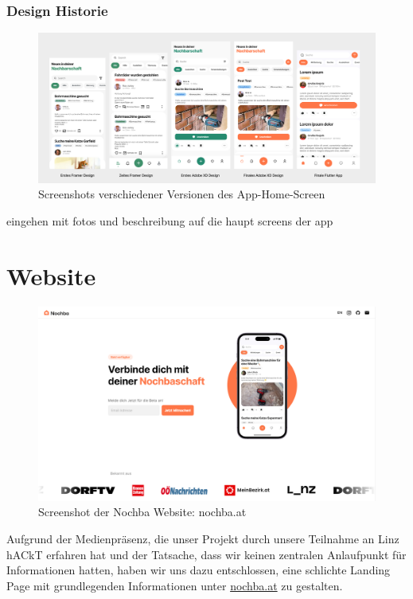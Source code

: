 \subsubsection{Design Historie}

\begin{figure}[h]
  \centering
  \includegraphics[width=1\textwidth]{pics/app-design-history.png}
  \caption{Screenshots verschiedener Versionen des App-Home-Screen}
  \label{fig:app-design-history}
  \end{figure}
eingehen mit fotos und beschreibung auf die haupt screens der app
\section{Website}
\begin{figure}[h]
  \includegraphics[width=1\textwidth]{pics/website-design.png}
  \caption{Screenshot der Nochba Website: nochba.at}
\end{figure}

Aufgrund der Medienpräsenz, die unser Projekt durch unsere Teilnahme an Linz hACkT erfahren hat und der Tatsache, dass wir keinen zentralen Anlaufpunkt für Informationen hatten, haben wir uns dazu entschlossen, eine schlichte Landing Page mit grundlegenden Informationen unter \href{https://nochba.at}{nochba.at} zu gestalten.

